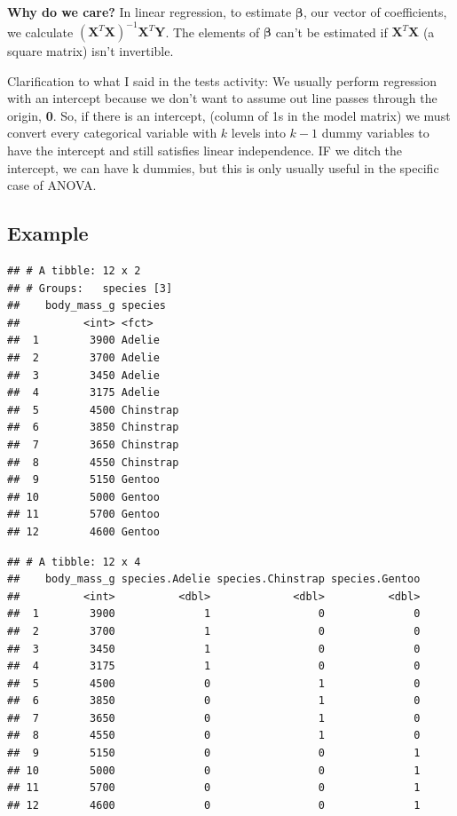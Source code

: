 \documentclass[
  openany]{book}
\begin{document}
\textbf{Why do we care?} In linear regression, to estimate \(\boldsymbol\beta\), our vector of coefficients, we calculate \((\boldsymbol X^T\boldsymbol X)^{-1}\boldsymbol X^T\boldsymbol Y\). The elements of \(\boldsymbol\beta\) can't be estimated if \(\boldsymbol X^T\boldsymbol X\) (a square matrix) isn't invertible.

Clarification to what I said in the tests activity: We usually perform regression with an intercept because we don't want to assume out line passes through the origin, \textbf{0}. So, if there is an intercept, (column of 1s in the model matrix) we must convert every categorical variable with \(k\) levels into \(k-1\) dummy variables to have the intercept and still satisfies linear independence. IF we ditch the intercept, we can have k dummies, but this is only usually useful in the specific case of ANOVA.

\hypertarget{example-3}{%
\subsection{Example}\label{example-3}}

\begin{verbatim}
## # A tibble: 12 x 2
## # Groups:   species [3]
##    body_mass_g species  
##          <int> <fct>    
##  1        3900 Adelie   
##  2        3700 Adelie   
##  3        3450 Adelie   
##  4        3175 Adelie   
##  5        4500 Chinstrap
##  6        3850 Chinstrap
##  7        3650 Chinstrap
##  8        4550 Chinstrap
##  9        5150 Gentoo   
## 10        5000 Gentoo   
## 11        5700 Gentoo   
## 12        4600 Gentoo
\end{verbatim}

\begin{verbatim}
## # A tibble: 12 x 4
##    body_mass_g species.Adelie species.Chinstrap species.Gentoo
##          <int>          <dbl>             <dbl>          <dbl>
##  1        3900              1                 0              0
##  2        3700              1                 0              0
##  3        3450              1                 0              0
##  4        3175              1                 0              0
##  5        4500              0                 1              0
##  6        3850              0                 1              0
##  7        3650              0                 1              0
##  8        4550              0                 1              0
##  9        5150              0                 0              1
## 10        5000              0                 0              1
## 11        5700              0                 0              1
## 12        4600              0                 0              1
\end{verbatim}
\end{document}
